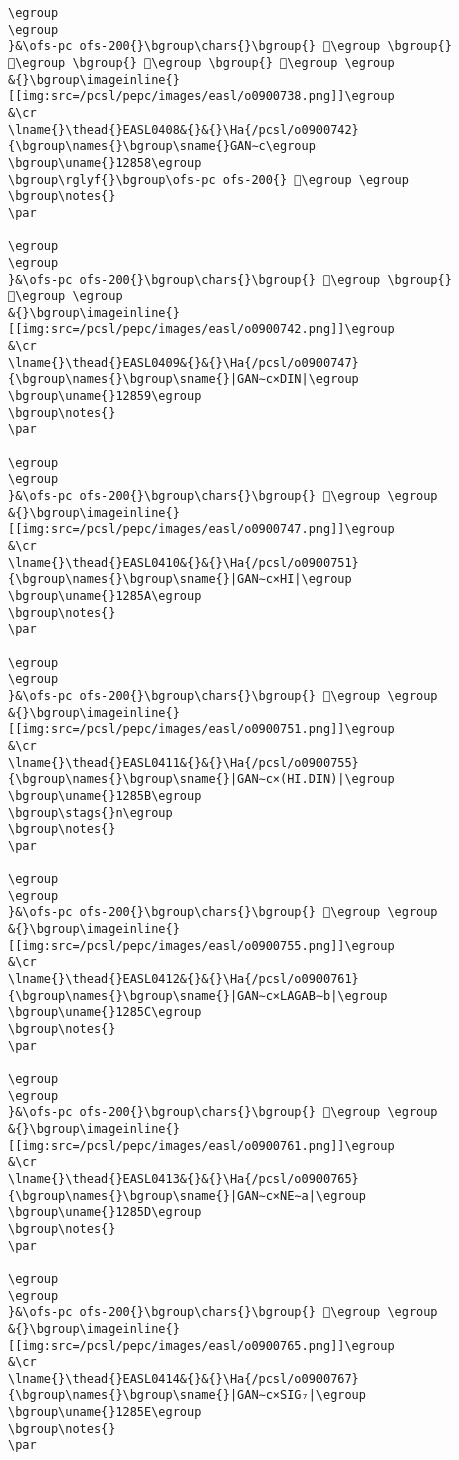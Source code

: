 \begin{verbatim}
\egroup
\egroup
}&\ofs-pc ofs-200{}\bgroup\chars{}\bgroup{} 𒡔\egroup \bgroup{} 𒡕\egroup \bgroup{} 𒡖\egroup \bgroup{} 𒡗\egroup \egroup
&{}\bgroup\imageinline{}[[img:src=/pcsl/pepc/images/easl/o0900738.png]]\egroup
&\cr
\lname{}\thead{}EASL0408&{}&{}\Ha{/pcsl/o0900742}{\bgroup\names{}\bgroup\sname{}GAN∼c\egroup
\bgroup\uname{}12858\egroup
\bgroup\rglyf{}\bgroup\ofs-pc ofs-200{} 𒡘\egroup \egroup
\bgroup\notes{}
\par 

\egroup
\egroup
}&\ofs-pc ofs-200{}\bgroup\chars{}\bgroup{} 𒡘\egroup \bgroup{} 𒡠\egroup \egroup
&{}\bgroup\imageinline{}[[img:src=/pcsl/pepc/images/easl/o0900742.png]]\egroup
&\cr
\lname{}\thead{}EASL0409&{}&{}\Ha{/pcsl/o0900747}{\bgroup\names{}\bgroup\sname{}|GAN∼c×DIN|\egroup
\bgroup\uname{}12859\egroup
\bgroup\notes{}
\par 

\egroup
\egroup
}&\ofs-pc ofs-200{}\bgroup\chars{}\bgroup{} 𒡙\egroup \egroup
&{}\bgroup\imageinline{}[[img:src=/pcsl/pepc/images/easl/o0900747.png]]\egroup
&\cr
\lname{}\thead{}EASL0410&{}&{}\Ha{/pcsl/o0900751}{\bgroup\names{}\bgroup\sname{}|GAN∼c×HI|\egroup
\bgroup\uname{}1285A\egroup
\bgroup\notes{}
\par 

\egroup
\egroup
}&\ofs-pc ofs-200{}\bgroup\chars{}\bgroup{} 𒡚\egroup \egroup
&{}\bgroup\imageinline{}[[img:src=/pcsl/pepc/images/easl/o0900751.png]]\egroup
&\cr
\lname{}\thead{}EASL0411&{}&{}\Ha{/pcsl/o0900755}{\bgroup\names{}\bgroup\sname{}|GAN∼c×(HI.DIN)|\egroup
\bgroup\uname{}1285B\egroup
\bgroup\stags{}n\egroup
\bgroup\notes{}
\par 

\egroup
\egroup
}&\ofs-pc ofs-200{}\bgroup\chars{}\bgroup{} 𒡛\egroup \egroup
&{}\bgroup\imageinline{}[[img:src=/pcsl/pepc/images/easl/o0900755.png]]\egroup
&\cr
\lname{}\thead{}EASL0412&{}&{}\Ha{/pcsl/o0900761}{\bgroup\names{}\bgroup\sname{}|GAN∼c×LAGAB∼b|\egroup
\bgroup\uname{}1285C\egroup
\bgroup\notes{}
\par 

\egroup
\egroup
}&\ofs-pc ofs-200{}\bgroup\chars{}\bgroup{} 𒡜\egroup \egroup
&{}\bgroup\imageinline{}[[img:src=/pcsl/pepc/images/easl/o0900761.png]]\egroup
&\cr
\lname{}\thead{}EASL0413&{}&{}\Ha{/pcsl/o0900765}{\bgroup\names{}\bgroup\sname{}|GAN∼c×NE∼a|\egroup
\bgroup\uname{}1285D\egroup
\bgroup\notes{}
\par 

\egroup
\egroup
}&\ofs-pc ofs-200{}\bgroup\chars{}\bgroup{} 𒡝\egroup \egroup
&{}\bgroup\imageinline{}[[img:src=/pcsl/pepc/images/easl/o0900765.png]]\egroup
&\cr
\lname{}\thead{}EASL0414&{}&{}\Ha{/pcsl/o0900767}{\bgroup\names{}\bgroup\sname{}|GAN∼c×SIG₇|\egroup
\bgroup\uname{}1285E\egroup
\bgroup\notes{}
\par 


\end{verbatim}
